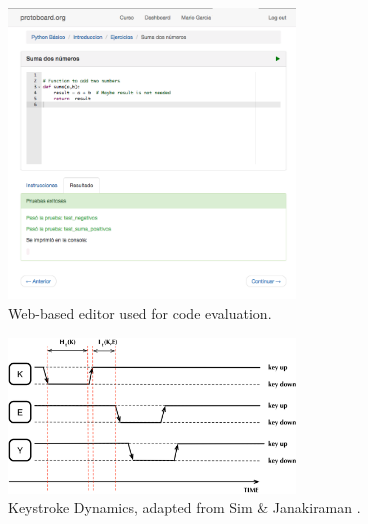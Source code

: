 \documentclass[a4paper]{llncs}
\begin{document}
\begin{figure}[!t] 
\centering 
\includegraphics[width=3in]{editorRresult.png} 
\caption{Web-based editor used for code evaluation.}
\label{fig_editor} 
\end{figure}
\begin{figure}[b!] 
\centering 
\includegraphics[width=3in]{KeyDyn.png} 
\caption{Keystroke Dynamics, adapted from Sim \& Janakiraman \cite{sim2007digraphs}.}
\label{fig_KD} 
\end{figure}
\end{document}
